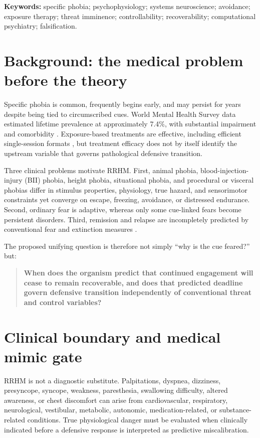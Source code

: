 \documentclass[9pt,twocolumn]{article}
\begin{document}
\noindent\textbf{Keywords:} specific phobia; psychophysiology; systems neuroscience; avoidance; exposure therapy; threat imminence; controllability; recoverability; computational psychiatry; falsification.

\section{Background: the medical problem before the theory}
Specific phobia is common, frequently begins early, and may persist for years despite being tied to circumscribed cues. World Mental Health Survey data estimated lifetime prevalence at approximately 7.4\%, with substantial impairment and comorbidity \cite{wardenaar2017}. Exposure-based treatments are effective, including efficient single-session formats \cite{odgers2022}, but treatment efficacy does not by itself identify the upstream variable that governs pathological defensive transition.

Three clinical problems motivate RRHM. First, animal phobia, blood-injection-injury (BII) phobia, height phobia, situational phobia, and procedural or visceral phobias differ in stimulus properties, physiology, true hazard, and sensorimotor constraints yet converge on escape, freezing, avoidance, or distressed endurance. Second, ordinary fear is adaptive, whereas only some cue-linked fears become persistent disorders. Third, remission and relapse are incompletely predicted by conventional fear and extinction measures \cite{trumpf2009remission,devos2025,bohnlein2020}.

The proposed unifying question is therefore not simply ``why is the cue feared?'' but:
\begin{quote}
\textbf{When does the organism predict that continued engagement will cease to remain recoverable, and does that predicted deadline govern defensive transition independently of conventional threat and control variables?}
\end{quote}

\section{Clinical boundary and medical mimic gate}
RRHM is not a diagnostic substitute. Palpitations, dyspnea, dizziness, presyncope, syncope, weakness, paresthesia, swallowing difficulty, altered awareness, or chest discomfort can arise from cardiovascular, respiratory, neurological, vestibular, metabolic, autonomic, medication-related, or substance-related conditions. True physiological danger must be evaluated when clinically indicated before a defensive response is interpreted as predictive miscalibration.
\end{document}
